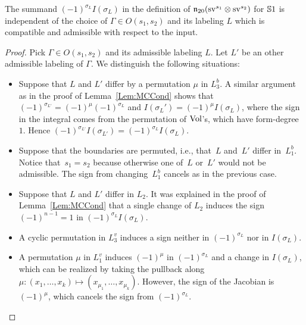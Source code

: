 \documentclass[\MainFolder/Text.tex]{subfiles}
\begin{document}

\begin{Lemma}\label{Lemma:Independence}
The summand $(-1)^{\sigma_L} I(\sigma_L)$ in the definition of $\mathfrak{n}_{20}(\mathrm{s}\mathrm{v}^{s_1}\otimes \mathrm{s}\mathrm{v}^{s_2})$ for $\mathbb{S}{1}$ is independent of the choice of $\Gamma\in O(s_1,s_2)$ and its labeling $L$ which is compatible and admissible with respect to the input.
\end{Lemma}
\begin{proof}
Pick $\Gamma\in O(s_1,s_2)$ and its admissible labeling $L$. Let $L'$ be an other admissible labeling of $\Gamma$. We distinguish the following situations:
\begin{itemize}
 \item Suppose that $L$ and $L'$ differ by a permutation $\mu$ in $L_3^b$. A similar argument as in the proof of Lemma~\ref{Lem:MCCond} shows that $(-1)^{\sigma_{L'}} = (-1)^\mu (-1)^{\sigma_L}$ and $I(\sigma_L') = (-1)^\mu I(\sigma_L)$, where the sign in the integral comes from the permutation of $\mathrm{Vol}$'s, which have form-degree $1$. Hence $(-1)^{\sigma_{L'}}I(\sigma_{L'}) = (-1)^{\sigma_{L}}I(\sigma_{L})$.
\item Suppose that the boundaries are permuted, i.e., that~$L$ and~$L'$ differ in~$L_1^b$. Notice that~$s_1=s_2$ because otherwise one of~$L$ or~$L'$ would not be admissible. The sign from changing~$L_1^b$ cancels as in the previous case. 
\item Suppose that $L$ and $L'$ differ in $L_2$. It was explained in the proof of Lemma~\ref{Lem:MCCond} that a single change of $L_2$ induces the sign $(-1)^{n-1} = 1$ in $(-1)^{\sigma_L} I(\sigma_L)$.  
\item A cyclic permutation in $L_3^v$ induces a sign neither in $(-1)^{\sigma_L}$ nor in $I(\sigma_L)$.
 \item A permutation $\mu$ in $L_1^v$ induces $(-1)^\mu$ in $(-1)^{\sigma_L}$ and a change in $I(\sigma_L)$, which can be realized by taking the pullback along $\mu: (x_1,\ldots,x_k)\mapsto (x_{\mu_1},\ldots,x_{\mu_k})$. However, the sign of the Jacobian is $(-1)^\mu$, which cancels the sign from $(-1)^{\sigma_L}$.
\end{itemize}


\end{proof}
\end{document}
